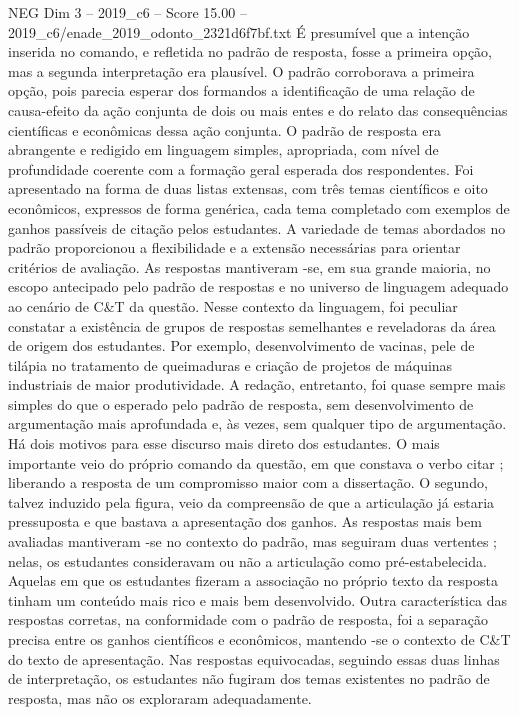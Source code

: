 \begin{textsample}{NEG Dim 3 – 2019\_c6 – Score 15.00 – 2019\_c6/enade\_2019\_odonto\_2321d6f7bf.txt}
É presumível que a intenção inserida no comando, e refletida no padrão de resposta, fosse a primeira opção, mas a segunda interpretação era plausível.
O padrão corroborava a primeira opção, pois parecia esperar dos formandos a identificação de uma relação de causa-efeito da ação conjunta de dois ou mais entes e do relato das consequências científicas e econômicas dessa ação conjunta.
O padrão de resposta era abrangente e redigido em linguagem simples, apropriada, com nível de profundidade coerente com a formação geral esperada dos respondentes.
Foi apresentado na forma de duas listas extensas, com três temas científicos e oito econômicos, expressos de forma genérica, cada tema completado com exemplos de ganhos passíveis de citação pelos estudantes.
A variedade de temas abordados no padrão proporcionou a flexibilidade e a extensão necessárias para orientar critérios de avaliação.
As respostas mantiveram -se, em sua grande maioria, no escopo antecipado pelo padrão de respostas e no universo de linguagem adequado ao cenário de C\&T da questão.
Nesse contexto da linguagem, foi peculiar constatar a existência de grupos de respostas semelhantes e reveladoras da área de origem dos estudantes.
Por exemplo, desenvolvimento de vacinas, pele de tilápia no tratamento de queimaduras e criação de projetos de máquinas industriais de maior produtividade.
A redação, entretanto, foi quase sempre mais simples do que o esperado pelo padrão de resposta, sem desenvolvimento de argumentação mais aprofundada e, às vezes, sem qualquer tipo de argumentação.
Há dois motivos para esse discurso mais direto dos estudantes.
O mais importante veio do próprio comando da questão, em que constava o verbo citar ; liberando a resposta de um compromisso maior com a dissertação.
O segundo, talvez induzido pela figura, veio da compreensão de que a articulação já estaria pressuposta e que bastava a apresentação dos ganhos.
As respostas mais bem avaliadas mantiveram -se no contexto do padrão, mas seguiram duas vertentes ; nelas, os estudantes consideravam ou não a articulação como pré-estabelecida.
Aquelas em que os estudantes fizeram a associação no próprio texto da resposta tinham um conteúdo mais rico e mais bem desenvolvido.
Outra característica das respostas corretas, na conformidade com o padrão de resposta, foi a separação precisa entre os ganhos científicos e econômicos, mantendo -se o contexto de C\&T do texto de apresentação.
Nas respostas equivocadas, seguindo essas duas linhas de interpretação, os estudantes não fugiram dos temas existentes no padrão de resposta, mas não os exploraram adequadamente.

\end{textsample}

